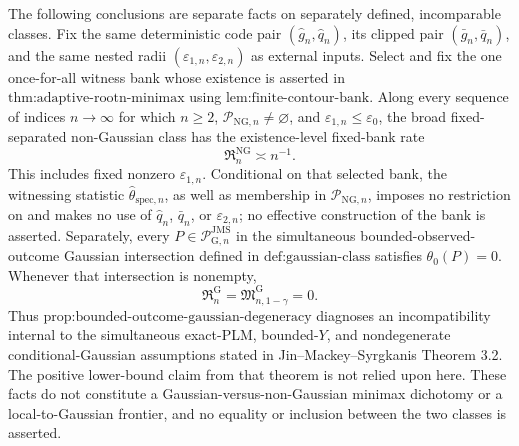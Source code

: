The following conclusions are separate facts on separately defined, incomparable classes.  Fix the same deterministic code pair \((\widehat g_n,\widehat q_n)\), its clipped pair \((\bar g_n,\bar q_n)\), and the same nested radii \((\varepsilon_{1,n},\varepsilon_{2,n})\) as external inputs.  Select and fix the one once-for-all witness bank whose existence is asserted in \(\text{thm:adaptive-rootn-minimax}\) using \(\text{lem:finite-contour-bank}\).  Along every sequence of indices \(n\to\infty\) for which \(n\ge2\), \(\mathcal P_{\mathrm{NG},n}\neq\varnothing\), and \(\varepsilon_{1,n}\le\varepsilon_0\), the broad fixed-separated non-Gaussian class has the existence-level fixed-bank rate
\[
 \mathfrak R_n^{\mathrm{NG}}\asymp n^{-1}.
\]
This includes fixed nonzero \(\varepsilon_{1,n}\).  Conditional on that selected bank, the witnessing statistic \(\widehat\theta_{\mathrm{spec},n}\), as well as membership in \(\mathcal P_{\mathrm{NG},n}\), imposes no restriction on and makes no use of \(\widehat q_n\), \(\bar q_n\), or \(\varepsilon_{2,n}\); no effective construction of the bank is asserted.  Separately, every \(P\in\mathcal P_{\mathrm G,n}^{\mathrm{JMS}}\) in the simultaneous bounded-observed-outcome Gaussian intersection defined in \(\text{def:gaussian-class}\) satisfies \(\theta_0(P)=0\).  Whenever that intersection is nonempty,
\[
 \mathfrak R_n^{\mathrm G}
 =\mathfrak M_{n,1-\gamma}^{\mathrm G}
 =0.
\]
Thus \(\text{prop:bounded-outcome-gaussian-degeneracy}\) diagnoses an incompatibility internal to the simultaneous exact-PLM, bounded-\(Y\), and nondegenerate conditional-Gaussian assumptions stated in Jin--Mackey--Syrgkanis Theorem 3.2.  The positive lower-bound claim from that theorem is not relied upon here.  These facts do not constitute a Gaussian-versus-non-Gaussian minimax dichotomy or a local-to-Gaussian frontier, and no equality or inclusion between the two classes is asserted.